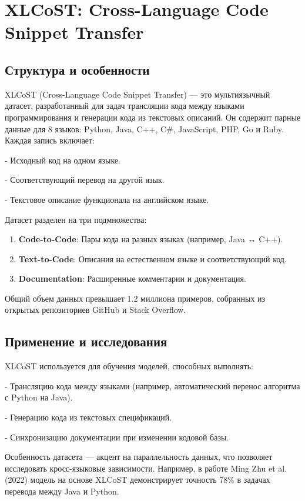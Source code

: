 \newpage
 \section{XLCoST: Cross-Language Code Snippet Transfer}

\subsection{Структура и особенности}
XLCoST (Cross-Language Code Snippet Transfer) — это мультиязычный датасет, разработанный для задач трансляции кода между языками программирования и генерации кода из текстовых описаний. Он содержит парные данные для 8 языков: Python, Java, C++, C\#, JavaScript, PHP, Go и Ruby. Каждая запись включает:

    
- Исходный код на одном языке.
    
- Соответствующий перевод на другой язык.
    
- Текстовое описание функционала на английском языке.


Датасет разделен на три подмножества:
\begin{enumerate}
    \item \textbf{Code-to-Code}: Пары кода на разных языках (например, Java ↔ C++).
    \item \textbf{Text-to-Code}: Описания на естественном языке и соответствующий код.
    \item \textbf{Documentation}: Расширенные комментарии и документация.
\end{enumerate}

Общий объем данных превышает 1.2 миллиона примеров, собранных из открытых репозиториев GitHub и Stack Overflow.

\subsection{Применение и исследования}
XLCoST используется для обучения моделей, способных выполнять:

    
- Трансляцию кода между языками (например, автоматический перенос алгоритма с Python на Java).
    
- Генерацию кода из текстовых спецификаций.
    
- Синхронизацию документации при изменении кодовой базы.


Особенность датасета — акцент на параллельность данных, что позволяет исследовать кросс-языковые зависимости. Например, в работе Ming Zhu et al. (2022) модель на основе XLCoST демонстрирует точность 78\% в задачах перевода между Java и Python.

